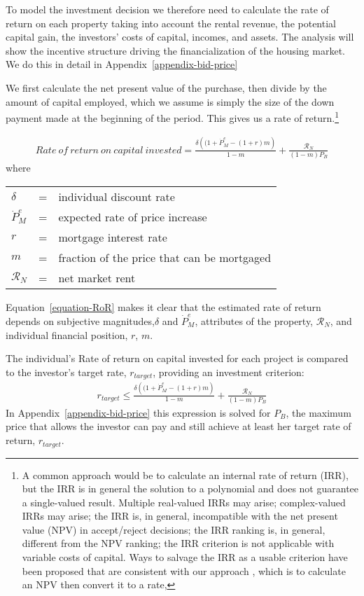 To model the investment decision  we therefore need to calculate the \gls{rate of return} on each property taking into account the rental revenue, the potential capital gain, the investors' costs of capital, incomes, and assets. The analysis will show the incentive structure driving the  financialization of the housing market. We do this in detail in Appendix~\ref{appendix-bid-price} 


We first calculate the net present value of the purchase, then divide by the amount of capital employed, which we assume is simply the size of the down payment made at the beginning of the period. This gives us a rate of return.\footnote{A common approach would be to calculate an internal rate of return (IRR), but  the IRR is in general the solution to a polynomial and does not guarantee a single-valued result.\cite{robinsonOPTIMALTERMINATIONIRR1996} Multiple real-valued  IRRs may arise;  complex-valued IRRs may arise;  the IRR is, in general, incompatible with the net present value (NPV) in accept/reject decisions; the IRR ranking is, in general, different from the NPV ranking; the IRR criterion is not applicable with variable costs of capital. Ways to salvage the IRR as a usable criterion have been proposed that are consistent with our approach \cite{magniAverageInternalRate2010}, which is to calculate an NPV then convert it to a rate,} 

\begin{eqnarray}
Rate\ of\ return\ on\ capital\ invested = \frac{\delta \left((1+ \dot P_M^e - (1+r)m\right)}{1-m} + \frac{\mathcal{R}_N}{(1-m)P_B}\label{equation-RoR}
\end{eqnarray}
where 

\begin{tabular}{lll}
 $\delta$       &=& individual discount rate \\
$\dot P_M^e $   &=& expected rate of price increase \\
$ r$            &=& mortgage interest rate \\
$m$             &=&  fraction of the price that can be mortgaged \\
$\mathcal{R}_N$ &=&  net  market rent
\end{tabular}
Equation~\ref{equation-RoR} makes it clear that the estimated rate of return depends on subjective magnitudes,$\delta$ and $\dot P_M^e$, attributes of the property, $ \mathcal{R}_N$, and  individual financial position, $r$, $m$.

The individual's Rate of return on capital  invested  for each project  is compared to the investor's target rate, $r_{target}$, providing  an investment criterion:
\begin{eqnarray}
r_{target} \le \frac{\delta \left((1+ \dot P_M^e - (1+r)m\right)}{1-m} + \frac{\mathcal{R}_N}{(1-m)P_B}
\end{eqnarray}
In Appendix~\ref{appendix-bid-price} this expression is solved for $P_B$, the  maximum price that allows the investor can pay and still achieve at least her  target rate of return, $r_{target}$.  

